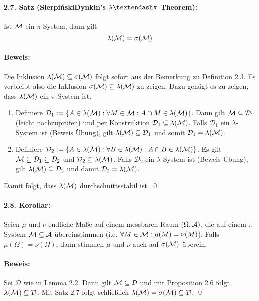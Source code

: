 \paragraph{2.7. Satz (Sierpi\'{n}ski\textendash Dynkin's $\lambda\textendash\pi$ Theorem):}Ist $\mathcal{M}$ ein $\pi$-System, dann gilt 
$$\lambda(\mathcal{M})=\sigma(\mathcal{M})$$

\paragraph{Beweis:}Die Inklusion $\lambda(\mathcal{M})\subseteq\sigma(\mathcal{M})$ folgt sofort aus der Bemerkung zu Definition 2.3. Es verbleibt also die Inklusion $\sigma(\mathcal{M})\subseteq\lambda(\mathcal{M})$ zu zeigen. Dazu gen\"ugt es zu zeigen, dass $\lambda(\mathcal{M})$ ein $\pi$-System ist. 
\begin{enumerate}[label=\Roman*.]
    \item Definiere $\mathcal{D}_1:=\left\{A\in\lambda(\mathcal{M}):\forall M\in\mathcal{M}:A\cap M\in\lambda(\mathcal{M})\right\}$. Dann gilt $\mathcal{M}\subseteq\mathcal{D}_1$ (leicht nachzupr\"ufen) und per Konstruktion $\mathcal{D}_1\subseteq\lambda(\mathcal{M})$. Falls $\mathcal{D}_1$ ein $\lambda$-System ist (Beweis \"Ubung), gilt $\lambda(\mathcal{M})\subseteq\mathcal{D}_1$ und somit $\mathcal{D}_1=\lambda(\mathcal{M})$.
    \item Definiere $\mathcal{D}_2:=\left\{A\in\lambda(\mathcal{M}):\forall B\in\lambda(\mathcal{M}):A\cap B\in\lambda(\mathcal{M})\right\}$. Es gilt $\mathcal{M}\subseteq\mathcal{D}_1\subseteq\mathcal{D}_2$ und $\mathcal{D}_2\subseteq\lambda(\mathcal{M})$. Falls $\mathcal{D}_2$ ein $\lambda$-System ist (Beweis \"Ubung), gilt $\lambda(\mathcal{M})\subseteq\mathcal{D}_2$ und damit $\mathcal{D}_2=\lambda(\mathcal{M})$. 
\end{enumerate}
Damit folgt, dass $\lambda(\mathcal{M})$ durchschnittsstabil ist. \qed

\paragraph{2.8. Korollar:}Seien $\mu$ und $\nu$ endliche Ma\ss{}e auf einem messbaren Raum $(\Omega,\mathcal{A})$, die auf einem $\pi$-System $\mathcal{M}\subseteq\mathcal{A}$ \"ubereinstimmen (i.e. $\forall M\in\mathcal{M}:\mu(M)=\nu(M)$). Falls $\mu(\Omega)=\nu(\Omega)$, dann stimmen $\mu$ und $\nu$ auch auf $\sigma(\mathcal{M})$ \"uberein. 

\paragraph{Beweis:}Sei $\mathcal{D}$ wie in Lemma 2.2. Dann gilt $\mathcal{M}\subseteq\mathcal{D}$ und mit Proposition 2.6 folgt $\lambda(\mathcal{M})\subseteq\mathcal{D}$. Mit Satz 2.7 folgt schlie\ss{}lich $\lambda(\mathcal{M})=\sigma(\mathcal{M})\subseteq\mathcal{D}$. \qed

